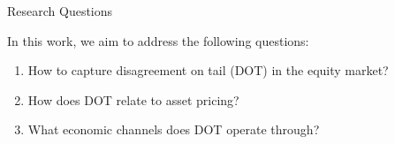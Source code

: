 \documentclass[11pt, aspectratio=169]{beamer}
\newenvironment{wideitemize}{\itemize\addtolength{\itemsep}{10pt}}{\enditemize}
\begin{document}
\begin{frame}{Research Questions}
    \bigskip
    \begin{wideitemize}
    \item In this work, we aim to address the following questions:
    \bigskip
    \begin{enumerate}
        \item How to \alert{capture} disagreement on tail (DOT) in the equity market?
        \bigskip
        \item How does DOT relate to \alert{asset pricing}?
        \bigskip
        \item What \alert{economic channels} does DOT operate through?
    \end{enumerate}
    \end{wideitemize}
\end{frame}

\end{document}
